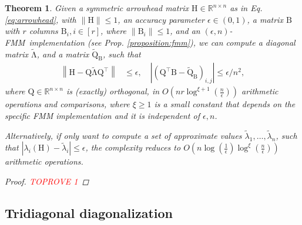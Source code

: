 \documentclass{article}
\newcommand{\labs}{\left|}
\newcommand{\rabs}{\right|}
\newcommand{\lnorm}{\left\|}
\newcommand{\rnorm}{\right\|}
\newcommand{\lpar}{\left(}
\newcommand{\rpar}{\right)}
\newtheorem{theorem}{Theorem}[section]
\newcommand\matB{\boldsymbol{\mathrm{B}}}
\newcommand\matH{\boldsymbol{\mathrm{H}}}
\newcommand\matQ{\boldsymbol{\mathrm{Q}}}
\newcommand\matQtilde{\widetilde{\boldsymbol{\mathrm{Q}}}}
\newcommand\matLambdatilde{\widetilde{\boldsymbol{\mathrm{\Lambda}}}}
\newcommand{\cfmm}{\xi}
\newcommand{\fmmalgo}{FMM} \usepackage[utf8]{inputenc}
\begin{document}
\begin{theorem}
    \label{theorem:arrowhead_diagonalization}
    Given a symmetric arrowhead matrix $\matH\in\mathbb{R}^{n\times n}$ as in Eq. \eqref{eq:arrowhead}, with $\|\matH\|\leq 1$, an accuracy parameter $\epsilon\in(0,1)$, a matrix $\matB$ with $r$ columns $\matB_i,i\in[r]$, where $\|\matB_i\|\leq 1$, and an $(\epsilon,n)$-\fmmalgo\   implementation (see Prop. \ref{proposition:fmm}), we can compute a diagonal matrix $\matLambdatilde$, and a matrix
    $\matQtilde_{\matB}$, such that 
    \begin{align*}
        \lnorm \matH-\matQ\matLambdatilde\matQ^\top \rnorm &\leq \epsilon,
        \quad
        \labs \lpar \matQ^\top\matB - \matQtilde_{\matB} \rpar_{i,j}\rabs \leq  \epsilon/n^2,
    \end{align*}
    where 
    $
        \matQ\in\mathbb{R}^{n\times n}
    $ is (exactly) orthogonal, in 
    $
        O\lpar nr\log^{\cfmm+1}(\tfrac{n}{\epsilon})\rpar
    $
    arithmetic operations and comparisons, where $\xi\geq 1$ is a small constant that depends on the specific FMM implementation and it is independent of $\epsilon,n$.

    Alternatively, if only want to compute a set of approximate values $\widetilde\lambda_1,\ldots,\widetilde\lambda_n$, such that $|\lambda_i(\matH)-\widetilde\lambda_i|\leq \epsilon$, the complexity reduces to $O\lpar n\log(\frac{1}{\epsilon})\log^{\cfmm}(\frac{n}{\epsilon})\rpar$ arithmetic operations.
    \begin{proof}\textcolor{red}{TOPROVE 1}\end{proof}
\end{theorem}


\subsection{Tridiagonal diagonalization}
\label{section:proof_of_tridiagonal_diagonalization}
\end{document}
